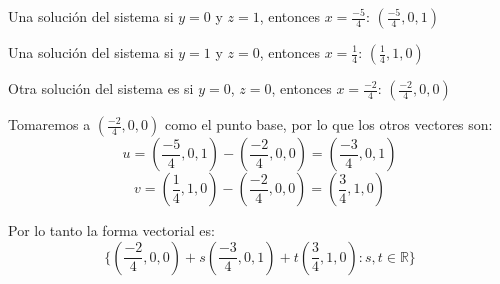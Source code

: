 \documentclass{article}
\begin{document}
Una solución del sistema si $y = 0$  y $z = 1$, entonces $x =\frac{-5}{4}$: $(\frac{-5}{4},0,1)$


Una solución del sistema si $y = 1$  y $z = 0$, entonces $x =\frac{1}{4}$: $(\frac{1}{4},1,0)$


Otra solución del sistema es si $y=0$, $z = 0$, entonces $x =\frac{-2}{4}$: $(\frac{-2}{4},0,0)$


Tomaremos a $(\frac{-2}{4},0,0)$ como el punto base, por lo que los otros vectores son:
$$u = (\frac{-5}{4},0,1)-(\frac{-2}{4},0,0) = (\frac{-3}{4}, 0, 1)$$
$$v = (\frac{1}{4},1,0)-(\frac{-2}{4},0,0) = (\frac{3}{4},1,0)$$

Por lo tanto la forma vectorial es:
$$\{(\frac{-2}{4},0,0)+s(\frac{-3}{4},0,1)+t(\frac{3}{4},1,0): s,t \in \mathbb{R}\}$$
\end{document}
